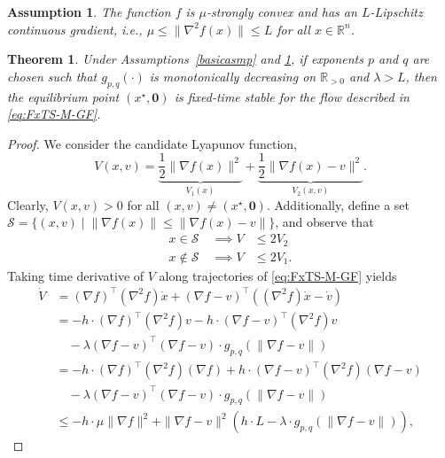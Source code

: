 \documentclass[letterpaper]{article}
\newtheorem{assumption}{Assumption}
\newtheorem{theorem}{Theorem}
\begin{document}
\begin{assumption}\label{ass:LipGradient}
    The function $f$ is $\mu$-strongly convex and has an $L$-Lipschitz continuous gradient, i.e., $\mu\leq\|\nabla^2 f(x)\|\leq L$ for all $x\in\mathbb{R}^n$.
\end{assumption}

\begin{theorem}\label{thm:FxTS-M-GF}
    Under Assumptions~\ref{basicasmp} and \ref{ass:LipGradient}, if exponents $p$ and $q$ are chosen such that $g_{p,q}(\cdot)$ is monotonically decreasing on $\mathbb R_{>0}$ and $\lambda>L$, then the equilibrium point $(x^\star,\bm{0})$ is fixed-time stable for the flow described in \eqref{eq:FxTS-M-GF}.
\end{theorem}
\begin{proof}
    We consider the candidate Lyapunov function,
    \begin{equation}\label{eq:FxTS-M-GF-V}
        V(x,v) = \underbrace{\frac{1}{2}\|\nabla f(x)\|^2}_{V_1(x)} + \underbrace{\frac{1}{2}\|\nabla f(x)-v\|^2}_{V_2(x,v)}.
    \end{equation}
    Clearly, $V(x,v)>0$ for all $(x,v)\neq(x^\star,\bm{0})$. Additionally, define a set $\mathcal{S} = \{(x,v)\; |\; \|\nabla f(x)\|\leq \|\nabla f(x)-v\|\}$, and observe that
    \begin{align}\label{eq:FxTS-M-GF-V1V2}
        x\in \mathcal S \quad \implies V &\leq 2V_2\nonumber\\
        x\notin \mathcal S \quad \implies V &\leq 2V_1.
    \end{align}
Taking time derivative of $V$ along trajectories of \eqref{eq:FxTS-M-GF} yields
    \begin{align*}
        \dot{V} &= (\nabla\!f)^\intercal(\nabla^2\!f)\dot{x} + (\nabla\!f-v)^\intercal((\nabla^2\!f)\dot{x}-\dot{v})\\
        &= -h\!\cdot\!(\nabla\!f)^\intercal(\nabla^2\!f)v-h\!\cdot\!(\nabla\!f-v)^\intercal(\nabla^2\!f)v\\
        &\quad -\lambda(\nabla\!f-v)^\intercal(\nabla\!f-v)\!\cdot\!g_{p,q}(\|\nabla\!f-v\|)\\
        &= -h\!\cdot\!(\nabla\!f)^\intercal(\nabla^2\!f)(\nabla\!f) + h\!\cdot\!(\nabla\!f-v)^\intercal(\nabla^2\!f)(\nabla\!f-v)\\
        &\quad -\lambda(\nabla\!f-v)^\intercal(\nabla\!f-v)\!\cdot\!g_{p,q}(\|\nabla\!f-v\|)\\
        &\leq -h\!\cdot\!\mu\|\nabla f\|^2 +\|\nabla f\!-\!v\|^2\left(h\!\cdot\!L\!-\!\lambda\!\cdot\!g_{p,q}(\|\nabla\!f\!-\!v\|)\right),

\end{align*}
\end{proof}
\end{document}
